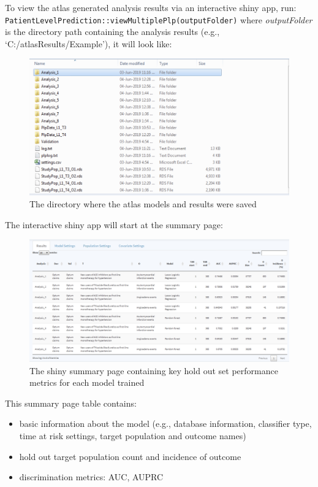 \documentclass[11pt]{book}
\providecommand{\tightlist}{%
  \setlength{\itemsep}{0pt}\setlength{\parskip}{0pt}}
\begin{document}
To view the atlas generated analysis results via an interactive shiny
app, run: \texttt{PatientLevelPrediction::viewMultiplePlp(outputFolder)}
where \emph{outputFolder} is the directory path containing the analysis
results (e.g., `C:/atlasResults/Example'), it will look like:

\begin{figure}

{\centering \includegraphics[width=0.8\linewidth]{images/PatientLevelPrediction/shiny/shinyResults} 

}

\caption{The directory where the atlas models and results were saved}\label{fig:shinyResults}
\end{figure}

The interactive shiny app will start at the summary page:

\begin{figure}

{\centering \includegraphics[width=0.8\linewidth]{images/PatientLevelPrediction/shiny/shinySummary} 

}

\caption{The shiny summary page containing key hold out set performance metrics for each model trained}\label{fig:shinySummary}
\end{figure}

This summary page table contains:

\begin{itemize}
\tightlist
\item
  basic information about the model (e.g., database information,
  classifier type, time at risk settings, target population and outcome
  names)
\item
  hold out target population count and incidence of outcome
\item
  discrimination metrics: AUC, AUPRC
\end{itemize}
\end{document}
